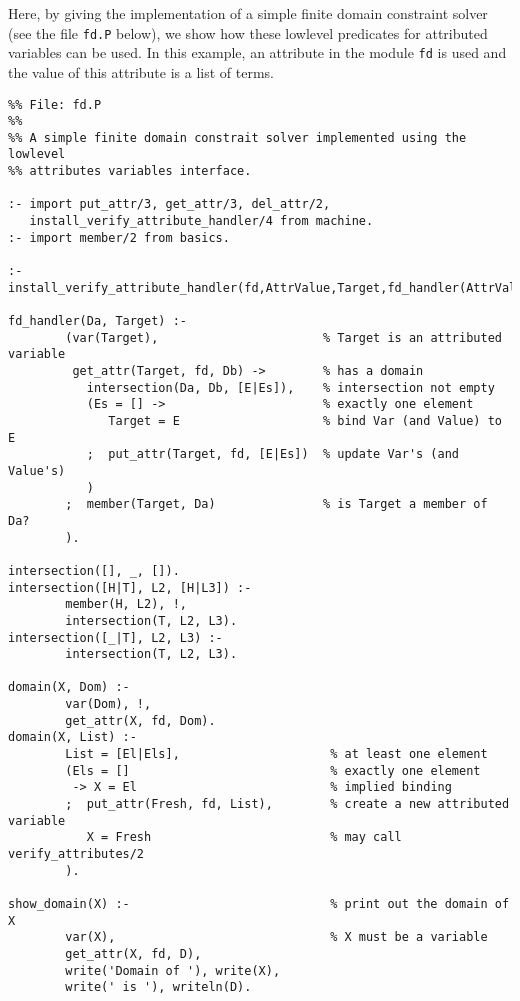 Here, by giving the implementation of a simple finite domain
constraint solver (see the file \texttt{fd.P} below), we show how
these lowlevel predicates for attributed variables can be used.  In
this example, an attribute in the module \texttt{fd} is used and the
value of this attribute is a list of terms.

\begin{small}
\begin{verbatim}
%% File: fd.P
%%
%% A simple finite domain constrait solver implemented using the lowlevel 
%% attributes variables interface.  

:- import put_attr/3, get_attr/3, del_attr/2, 
   install_verify_attribute_handler/4 from machine.
:- import member/2 from basics.

:- install_verify_attribute_handler(fd,AttrValue,Target,fd_handler(AttrValue,Target)).

fd_handler(Da, Target) :-
        (var(Target),                       % Target is an attributed variable
         get_attr(Target, fd, Db) ->        % has a domain
           intersection(Da, Db, [E|Es]),    % intersection not empty
           (Es = [] ->                      % exactly one element
              Target = E                    % bind Var (and Value) to E
           ;  put_attr(Target, fd, [E|Es])  % update Var's (and Value's)
           )
        ;  member(Target, Da)               % is Target a member of Da?
        ).

intersection([], _, []).
intersection([H|T], L2, [H|L3]) :-
        member(H, L2), !,
        intersection(T, L2, L3).
intersection([_|T], L2, L3) :-
        intersection(T, L2, L3).

domain(X, Dom) :- 
        var(Dom), !, 
        get_attr(X, fd, Dom). 
domain(X, List) :- 
        List = [El|Els],                     % at least one element 
        (Els = []                            % exactly one element
         -> X = El                           % implied binding 
        ;  put_attr(Fresh, fd, List),        % create a new attributed variable
           X = Fresh                         % may call verify_attributes/2
        ).

show_domain(X) :-                            % print out the domain of X
        var(X),                              % X must be a variable
        get_attr(X, fd, D),
        write('Domain of '), write(X),
        write(' is '), writeln(D).

\end{verbatim}
\end{small}

